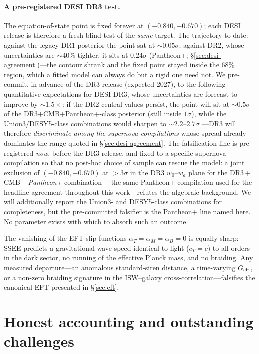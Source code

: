 \documentclass[aps,prd,preprint,amsmath,amssymb,nofootinbib,longbibliography]{revtex4-2}
\begin{document}
\paragraph{A pre-registered DESI DR3 test.} The equation-of-state point is
fixed forever at $(-0.840,-0.670)$; each DESI release is therefore a fresh
blind test of the \emph{same} target. The trajectory to date: against the legacy DR1 posterior the
point sat at ${\sim}0.05\sigma$; against DR2,
whose uncertainties are ${\sim}40\%$ tighter, it sits at $0.24\sigma$
(Pantheon+; \S\ref{sec:desi-agreement})---the contour shrank and the fixed
point stayed inside the $68\%$ region, which a fitted model can always do but
a rigid one need not. We pre-commit, in advance of the DR3 release (expected
2027), to the following quantitative expectations for
DESI DR3, whose uncertainties are forecast to improve by ${\sim}1.5\times$:
if the DR2 central values persist, the point will sit at ${\sim}0.5\sigma$ of
the DR3$+$CMB$+$Pantheon+-class posterior (still inside $1\sigma$), while the
Union3/DESY5-class combinations would sharpen to ${\sim}2.2$--$2.7\sigma$
---DR3 will therefore \emph{discriminate among the supernova compilations}
whose spread already dominates the range quoted in \S\ref{sec:desi-agreement}.
The falsification line is pre-registered \emph{now}, before the DR3 release, and
fixed to a specific supernova compilation so that no post-hoc choice of sample can
rescue the model: a joint exclusion of $(-0.840,-0.670)$ at ${>}3\sigma$ in the
DR3 $w_0$--$w_a$ plane for the DR3\,$+$\,CMB\,$+$\,\emph{Pantheon+} combination
---the same Pantheon+ compilation used for the headline agreement throughout this
work---refutes the algebraic background. We will additionally report the
Union3- and DESY5-class combinations for completeness, but the pre-committed
falsifier is the Pantheon+ line named here. No parameter exists with which
to absorb such an outcome.

The vanishing of the EFT slip functions $\alpha_T=\alpha_M=\alpha_B=0$ is
equally sharp: SSEE predicts a gravitational-wave speed identical to light
($c_T=c$) to all orders in the dark sector, no running of the effective Planck
mass, and no braiding. Any measured departure---an anomalous standard-siren
distance, a time-varying $G_{\rm eff}$, or a non-zero braiding signature in the
ISW--galaxy cross-correlation---falsifies the canonical EFT presented in
\S\ref{sec:eft}.

\section{Honest accounting and outstanding challenges}
\label{sec:open}
\end{document}
